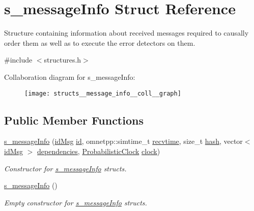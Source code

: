 \hypertarget{structs__message_info}{}\section{s\+\_\+message\+Info Struct Reference}
\label{structs__message_info}


Structure containing information about received messages required to causally order them as well as to execute the error detectors on them.  




{\ttfamily \#include $<$structures.\+h$>$}



Collaboration diagram for s\+\_\+message\+Info\+:\nopagebreak
\begin{figure}[H]
\begin{center}
\leavevmode
\texttt{[image: structs\_\_message\_info\_\_coll\_\_graph]}
\end{center}
\end{figure}
\subsection*{Public Member Functions}
\begin{DoxyCompactItemize}
\item 
\hyperlink{structs__message_info_aa626a79c3b41f14b406f8d86b87fcfb9}{s\+\_\+message\+Info} (\hyperlink{structures_8h_a83a1d9a070efa5341da84cfd8e28d3e5}{id\+Msg} \hyperlink{structs__message_info_a6c2928774199848fd25b4e8ffb7870c2}{id}, omnetpp\+::simtime\+\_\+t \hyperlink{structs__message_info_a3600b24205dc07ce06774af44976c107}{recvtime}, size\+\_\+t \hyperlink{structs__message_info_a9b627c36e814fbbd04a89bc6e827e4ff}{hash}, vector$<$ \hyperlink{structures_8h_a83a1d9a070efa5341da84cfd8e28d3e5}{id\+Msg} $>$ \hyperlink{structs__message_info_a82f52cb53fb0e9b1b985f173f3a013be}{dependencies}, \hyperlink{class_probabilistic_clock}{Probabilistic\+Clock} \hyperlink{structs__message_info_ad35ea02bbca3d54d5b150bb6ea476888}{clock})
\begin{DoxyCompactList}\small\item\em Constructor for \hyperlink{structs__message_info}{s\+\_\+message\+Info} structs. \end{DoxyCompactList}\item 
\hyperlink{structs__message_info_a4cde6289906418221236646ae3df77c8}{s\+\_\+message\+Info} ()
\begin{DoxyCompactList}\small\item\em Empty constructor for \hyperlink{structs__message_info}{s\+\_\+message\+Info} structs. \end{DoxyCompactList}\end{DoxyCompactItemize}

